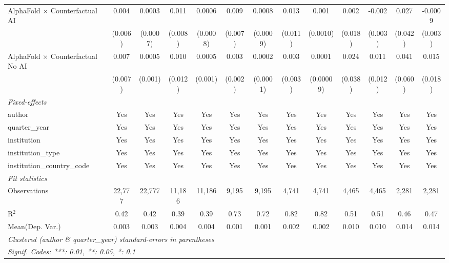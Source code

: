 \begin{tabular}{lcccccccccccc}
   AlphaFold $\times$ Counterfactual AI     & 0.004   & 0.0003   & 0.011   & 0.0006   & 0.009    & 0.0008   & 0.013   & 0.001     & 0.002   & -0.002  & 0.027   & -0.0009\\   
                                            & (0.006) & (0.0007) & (0.008) & (0.0008) & (0.007)  & (0.0009) & (0.011) & (0.0010)  & (0.018) & (0.003) & (0.042) & (0.003)\\   
   AlphaFold $\times$ Counterfactual No AI  & 0.007   & 0.0005   & 0.010   & 0.0005   & 0.003    & 0.0002   & 0.003   & 0.0001    & 0.024   & 0.011   & 0.041   & 0.015\\   
                                            & (0.007) & (0.001)  & (0.012) & (0.001)  & (0.002)  & (0.0001) & (0.003) & (0.00009) & (0.038) & (0.012) & (0.060) & (0.018)\\   
   \midrule
   \emph{Fixed-effects}\\
   author                                   & Yes     & Yes      & Yes     & Yes      & Yes      & Yes      & Yes     & Yes       & Yes     & Yes     & Yes     & Yes\\  
   quarter\_year                            & Yes     & Yes      & Yes     & Yes      & Yes      & Yes      & Yes     & Yes       & Yes     & Yes     & Yes     & Yes\\  
   institution                              & Yes     & Yes      & Yes     & Yes      & Yes      & Yes      & Yes     & Yes       & Yes     & Yes     & Yes     & Yes\\  
   institution\_type                        & Yes     & Yes      & Yes     & Yes      & Yes      & Yes      & Yes     & Yes       & Yes     & Yes     & Yes     & Yes\\  
   institution\_country\_code               & Yes     & Yes      & Yes     & Yes      & Yes      & Yes      & Yes     & Yes       & Yes     & Yes     & Yes     & Yes\\  
   \midrule
   \emph{Fit statistics}\\
   Observations                             & 22,777  & 22,777   & 11,186  & 11,186   & 9,195    & 9,195    & 4,741   & 4,741     & 4,465   & 4,465   & 2,281   & 2,281\\  
   R$^2$                                    & 0.42    & 0.42     & 0.39    & 0.39     & 0.73     & 0.72     & 0.82    & 0.82      & 0.51    & 0.51    & 0.46    & 0.47\\  
Mean(Dep. Var.) & 0.003 & 0.003 & 0.004 & 0.004 & 0.001 & 0.001 & 0.002 & 0.002 & 0.010 & 0.010 & 0.014 & 0.014 \\
   \midrule \midrule
   \multicolumn{13}{l}{\emph{Clustered (author \& quarter\_year) standard-errors in parentheses}}\\
   \multicolumn{13}{l}{\emph{Signif. Codes: ***: 0.01, **: 0.05, *: 0.1}}\\
\end{tabular}
\par\endgroup
